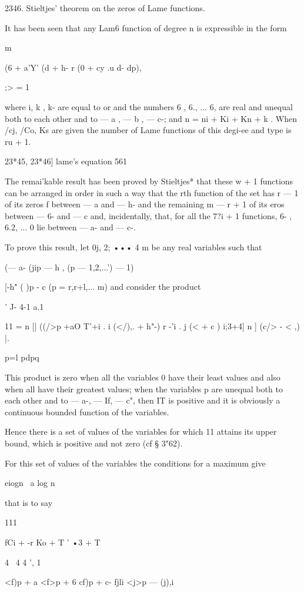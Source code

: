 {{{{{{{2346. Stieltjes' theorem on the zeros of Lame functions.

It has been seen that any Lam6 function of degree n is expressible in
the form

m

(6 + a'Y' (d + h- r (0 + cy .u d- dp),

;> = 1

where i, k , k- are equal to or and the numbers 6 , 6., ... 6, are
real and unequal both to each other and to — a , — b , — c-; and n =
ni + Ki + Kn + k . When /cj, /Co, Ks are given the number of Lame
functions of this degi-ee and type is ru + 1.

23*45, 23*46] lame's equation 561

The remai'kable result has been proved by Stieltjes* that these w + 1
functions can be arranged in order in such a way that the rth function
of the set has r — 1 of its zeros f between — a and — h- and the
remaining m — r + 1 of its eros between — 6- and — c and,
incidentally, that, for all the 7?i + 1 functions, 6- , 6.2, ... 0 lie
between — a- and — c-.

To prove this result, let 0j, 2; ••• 4 m be any real variables such
that

(— a- (jip — h , (p — 1,2,...') — 1)

[-h" ( )p - c (p = r,r+l,... m) and consider the product

 ' J- 4-1 a.1

11 = n [| ((/>p +aO T'+i . i (</),. + h"-) r -'i . j (< + c ) i;3+4] n
] (c/> - < ,) |.

p=l pdpq

This product is zero when all the variables 0 have their least values
and also when all have their greatest values; when the variables p
are unequal both to each other and to — a-, — If, — c", then IT is
positive and it is obviously a continuous bounded function of the
variables.

Hence there is a set of values of the variables for which 11 attains
its upper bound, which is positive and not zero (cf § 3"62).

For this set of values of the variables the conditions for a maximum
give

eiogn \ a log n \

that is to say

111

fCi + -r Ko + T ' •3 + T

4 \ 4 4 ', 1 \

<f)p + a <f>p + 6 cf)p + c- fjli <j>p — (j),i

}}}}}}}
